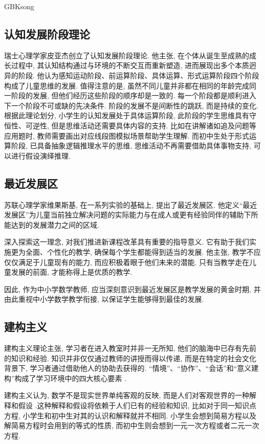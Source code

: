 \documentclass[a4paper,12pt,twoside]{ctexart}
\begin{document}
\begin{CJK*}{GBK}{song}
\subsection{认知发展阶段理论}
    瑞士心理学家皮亚杰创立了认知发展阶段理论\cite{liu}. 他主张, 在个体从诞生至成熟的成长过程中, 其认知结构通过与环境的不断交互而重新塑造, 进而展现出多个本质迥异的阶段. 他认为感知运动阶段、前运算阶段、具体运算、形式运算阶段四个阶段构成了儿童思维的发展\cite{wang}. 值得注意的是, 虽然不同儿童并非都在相同的年龄完成同一阶段的发展, 但他们经历这些阶段的顺序却是一致的. 每一个阶段都是顺利进入下一个阶段不可或缺的先决条件. 阶段的发展不是间断性的跳跃, 而是持续的变化. 根据此理论划分, 小学生的认知发展处于具体运算阶段, 此阶段的学生思维具有守恒性、可逆性, 但是思维活动还需要具体内容的支持. 比如在讲解诸如追及问题等应用题时, 教师需要画出对应线段图模拟场景帮助学生理解. 而初中生处于形式运算阶段, 已具备抽象逻辑推理水平的思维, 思维活动不再需要借助具体事物支持, 可以进行假设演绎推理.
\subsection{最近发展区}
    苏联心理学家维果斯基, 在一系列实验的基础上, 提出了最近发展区. 他定义“最近发展区”为儿童当前独立解决问题的实际能力与在成人或更有经验同伴的辅助下所能达到的发展潜力之间的区域\cite{liao}.

深入探索这一理念, 对我们推进新课程改革具有重要的指导意义. 它有助于我们实施更为全面、个性化的教学, 确保每个学生都能得到适当的发展. 他主张, 教学不应仅仅满足于儿童现有的能力, 而应积极着眼于他们未来的潜能. 只有当教学走在儿童发展的前面, 才能称得上是优质的教学.

因此,  作为中小学数学教师,  应当深刻意识到最近发展区是教学发展的黄金时期,  并由此重视中小学数学教学衔接,  以保证学生能够得到最佳的发展.

\subsection{建构主义}
建构主义理论主张, 学习者在进入教室时并非一无所知, 他们的脑海中已存有先前的知识和经验. 知识并非仅仅通过教师的讲授而得以传递, 而是在特定的社会文化背景下, 学习者通过借助他人的协助去获得的. “情境”、“协作”、“会话”和“意义建构”构成了学习环境中的四大核心要素 \cite{zhao}.

建构主义认为,  数学不是现实世界单纯客观的反映,  而是人们对客观世界的一种解释和假设 \cite{zhang}.这种解释和假设将依赖于人们已有的经验和知识,  比如对于同一知识点方程,  小学生和初中生对其的认识和解释就并不相同.  小学生会想到简易方程以及解简易方程时会用到的等式的性质,  而初中生则会想到一元一次方程或者二元一次方程.


\end{CJK*}
\end{document}

